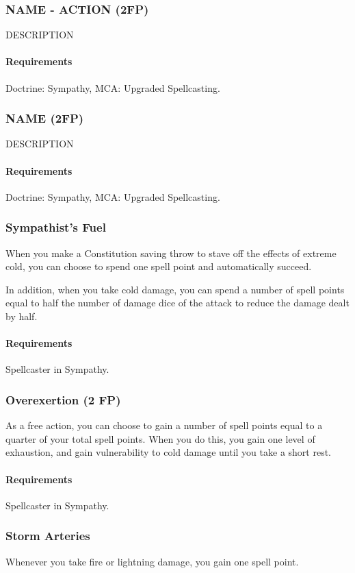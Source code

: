 \subsubsection{NAME - ACTION (2FP)} \label{feat::name}
    DESCRIPTION
    \paragraph{Requirements} Doctrine: Sympathy, MCA: Upgraded Spellcasting.
\subsubsection{NAME (2FP)} \label{feat::name}
    DESCRIPTION
    \paragraph{Requirements} Doctrine: Sympathy, MCA: Upgraded Spellcasting.

\subsubsection{Sympathist's Fuel} \label{feat::sympathistsfuel}
    When you make a Constitution saving throw to stave off the effects of extreme cold, you can choose to spend one spell point and automatically succeed.

    In addition, when you take cold damage, you can spend a number of spell points equal to half the number of damage dice of the attack to reduce the damage dealt by half.
    \paragraph{Requirements} Spellcaster in Sympathy.
\subsubsection{Overexertion (2 FP)} \label{feat::overexertion}
    As a free action, you can choose to gain a number of spell points equal to a quarter of your total spell points.
    When you do this, you gain one level of exhaustion, and gain vulnerability to cold damage until you take a short rest.
    \paragraph{Requirements} Spellcaster in Sympathy.
\subsubsection{Storm Arteries} \label{feat::stormarteries}
    Whenever you take fire or lightning damage, you gain one spell point.
